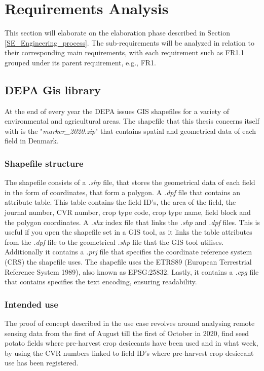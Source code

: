 \chapter{Requirements Analysis}

This section will elaborate on the elaboration phase described in Section \ref{SE_Engineering_process}. The sub-requirements will be analyzed in relation to their corresponding main requirements, with each requirement such as FR1.1 grouped under its parent requirement, e.g., FR1.


\section{DEPA Gis library}
\label{Sec:DEPAGIsLib}
At the end of every year the \acrshort{DEPA} issues GIS shapefiles for a variety of environmental and agricultural areas. The shapefile that this thesis concerns itself with is the "\textit{marker\_2020.zip}" that contains spatial and geometrical data of each field in Denmark\cite{Jordbrugsanalyser}. 
\subsection{Shapefile structure}
The shapefile consists of a \textit{.shp} file, that stores the geometrical data of each field in the form of coordinates, that form a polygon. A \textit{.dpf} file that contains an attribute table. This table contains the field ID's, the area of the field, the journal number, CVR number, crop type code, crop type name, field block and the polygon coordinates. A \textit{.shx} index file that links the \textit{.shp} and \textit{.dpf} files. This is useful if you open the shapefile set in a GIS tool, as it links the table attributes from the \textit{.dpf} file to the geometrical \textit{.shp} file that the GIS tool utilises. Additionally it contains a \textit{.prj} file that specifies the coordinate reference system (CRS) the shapefile uses. The shapefile uses the ETRS89 (European Terrestrial Reference System 1989), also known as EPSG:25832. Lastly, it contains a \textit{.cpg} file that contains specifies the text encoding, ensuring readability\cite{sam2023shapefile}\cite{Jordbrugsanalyser}.

\subsection{Intended use}
The proof of concept described in the use case revolves around analysing remote sensing data from the first of August till the first of October in 2020, find seed potato fields where pre-harvest crop desiccants have been used and in what week, by using the CVR numbers linked to field ID's  where pre-harvest crop desiccant use has been registered\cite{OplægPP}.

